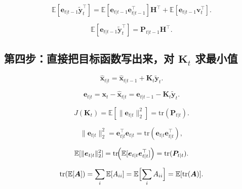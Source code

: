 
\[
\mathbb{E}[\bm{e}_{t|t-1}\tilde{\bm{y}}_t^\top]
= \mathbb{E}[\bm{e}_{t|t-1}\bm{e}_{t|t-1}^\top]\bm{H}^\top
+ \mathbb{E}[\bm{e}_{t|t-1}\bm{v}_t^\top].
\]


\[
\mathbb{E}[\bm{e}_{t|t-1}\tilde{\bm{y}}_t^\top]
= \bm{P}_{t|t-1}\bm{H}^\top.
\]


\subsection{第四步：直接把目标函数写出来，对 \texorpdfstring{$\bm{K}_t$}{K_t} 求最小值}


\[
\hat{\bm{x}}_{t|t}
= \hat{\bm{x}}_{t|t-1} + \bm{K}_t\tilde{\bm{y}}_t.
\]


\[
\bm{e}_{t|t}
= \bm{x}_t - \hat{\bm{x}}_{t|t}
= \bm{e}_{t|t-1} - \bm{K}_t\tilde{\bm{y}}_t.
\]



\[
J(\bm{K}_t)
= \mathbb{E}[\|\bm{e}_{t|t}\|_2^2]
= \mathrm{tr}(\bm{P}_{t|t}).
\]


\[
\|\bm{e}_{t|t}\|_2^2
= \bm{e}_{t|t}^\top\bm{e}_{t|t}
= \mathrm{tr}(\bm{e}_{t|t}\bm{e}_{t|t}^\top),
\]


\[
\mathbb{E}[\|\bm{e}_{t|t}\|_2^2]
= \mathrm{tr}\!\Bigl(
\mathbb{E}[\bm{e}_{t|t}\bm{e}_{t|t}^\top]
\Bigr)
= \mathrm{tr}(\bm{P}_{t|t}).
\]


\[
\mathrm{tr}(\mathbb{E}[\bm{A}])
= \sum_i \mathbb{E}[A_{ii}]
= \mathbb{E}\Bigl[\sum_i A_{ii}\Bigr]
= \mathbb{E}[\mathrm{tr}(\bm{A})].
\]

